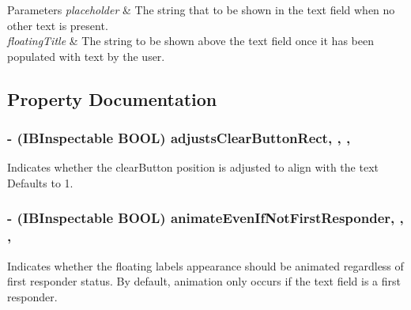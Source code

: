 \begin{DoxyParams}{Parameters}
{\em placeholder} & The string that to be shown in the text field when no other text is present. \\
\hline
{\em floating\+Title} & The string to be shown above the text field once it has been populated with text by the user. \\
\hline
\end{DoxyParams}


\subsection{Property Documentation}
\hypertarget{interface_j_v_float_labeled_text_field_a2eca492728f3ea23c780debb151f27f1}{}
\subsubsection[{adjusts\+Clear\+Button\+Rect}]{\setlength{\rightskip}{0pt plus 5cm}-\/ (I\+B\+Inspectable B\+O\+O\+L) adjusts\+Clear\+Button\+Rect\hspace{0.3cm}{\ttfamily [read]}, {\ttfamily [write]}, {\ttfamily [nonatomic]}, {\ttfamily [assign]}}\label{interface_j_v_float_labeled_text_field_a2eca492728f3ea23c780debb151f27f1}
Indicates whether the clear\+Button position is adjusted to align with the text Defaults to 1. \hypertarget{interface_j_v_float_labeled_text_field_ac452b0c37e43fa86df3a6d136ab91e93}{}
\subsubsection[{animate\+Even\+If\+Not\+First\+Responder}]{\setlength{\rightskip}{0pt plus 5cm}-\/ (I\+B\+Inspectable B\+O\+O\+L) animate\+Even\+If\+Not\+First\+Responder\hspace{0.3cm}{\ttfamily [read]}, {\ttfamily [write]}, {\ttfamily [nonatomic]}, {\ttfamily [assign]}}\label{interface_j_v_float_labeled_text_field_ac452b0c37e43fa86df3a6d136ab91e93}
Indicates whether the floating label\textquotesingle{}s appearance should be animated regardless of first responder status. By default, animation only occurs if the text field is a first responder. \hypertarget{interface_j_v_float_labeled_text_field_a63571476c8d5dbbd4103a644d0d060b7}{}
